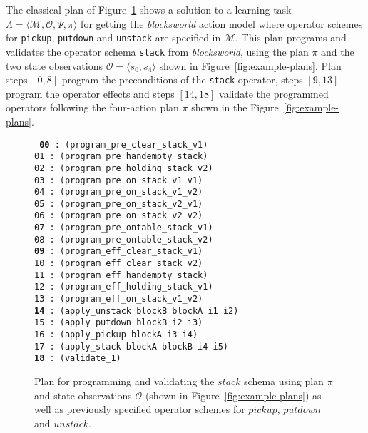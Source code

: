 \documentclass[3p,times]{elsarticle}
\newcommand{\tup}[1]{{\langle #1 \rangle}}
\begin{document}
The classical plan of Figure~\ref{fig:plan-lplan} shows a solution to a learning task $\Lambda=\tup{\mathcal{M},\mathcal{O},\Psi,\pi}$ for getting the {\em blocksworld} action model where operator schemes for {\tt\small pickup}, {\tt\small putdown} and {\tt\small unstack} are specified in $\mathcal{M}$. This plan programs and validates the operator schema {\tt\small stack} from {\em blocksworld}, using the plan $\pi$ and the two state observations $\mathcal{O}=\tup{s_0,s_4}$ shown in Figure~\ref{fig:example-plans}. Plan steps $[0,8]$ program the preconditions of the {\tt\small stack} operator, steps $[9,13]$ program the operator effects and steps $[14,18]$ validate the programmed operators following the four-action plan $\pi$ shown in the Figure~\ref{fig:example-plans}.

\begin{figure}[hbt!]
{\footnotesize\tt
     {\bf 00} : (program\_pre\_clear\_stack\_v1)\\
     01 : (program\_pre\_handempty\_stack)\\
     02 : (program\_pre\_holding\_stack\_v2)\\
     03 : (program\_pre\_on\_stack\_v1\_v1)\\
     04 : (program\_pre\_on\_stack\_v1\_v2)\\
     05 : (program\_pre\_on\_stack\_v2\_v1)\\
     06 : (program\_pre\_on\_stack\_v2\_v2)\\
     07 : (program\_pre\_ontable\_stack\_v1)\\
     08 : (program\_pre\_ontable\_stack\_v2)\\
     {\bf 09} : (program\_eff\_clear\_stack\_v1)\\
    10 : (program\_eff\_clear\_stack\_v2)\\
    11 : (program\_eff\_handempty\_stack)\\
    12 : (program\_eff\_holding\_stack\_v1)\\
    13 : (program\_eff\_on\_stack\_v1\_v2)\\
    {\bf 14} : (apply\_unstack blockB blockA i1 i2)\\
    15 : (apply\_putdown blockB i2 i3)\\
    16 : (apply\_pickup blockA i3 i4)\\
    17 : (apply\_stack blockA blockB i4 i5)\\
    {\bf 18} : (validate\_1)
}
 \caption{\small Plan for programming and validating the $stack$ schema using plan $\pi$ and state observations $\mathcal{O}$ (shown in Figure~\ref{fig:example-plans}) as well as previously specified operator schemes for $pickup$, $putdown$ and $unstack$.}
\label{fig:plan-lplan}
\end{figure}
\end{document}
